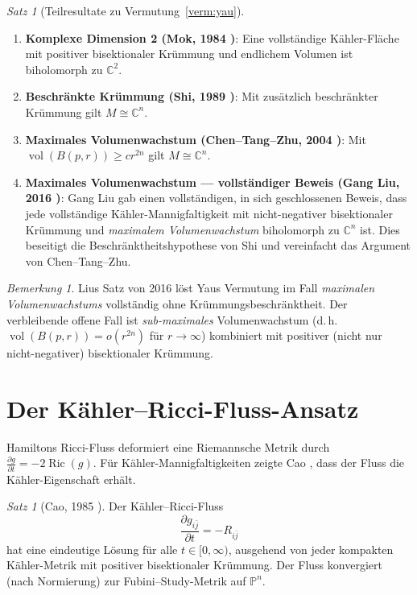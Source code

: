 \documentclass[12pt,a4paper]{amsart}
\theoremstyle{definition}
\theoremstyle{remark}
\newtheorem{satz}[theorem]{Satz}
\newtheorem{bemerkung}[theorem]{Bemerkung}
\DeclareMathOperator{\Ric}{Ric}
\DeclareMathOperator{\vol}{vol}
\newcommand{\CC}{\mathbb{C}}
\newcommand{\PP}{\mathbb{P}}
\begin{document}
\begin{satz}[Teilresultate zu Vermutung~\ref{verm:yau}]
\begin{enumerate}[label=(\roman*)]
  \item \textbf{Komplexe Dimension 2 (Mok, 1984 \cite{Mok1984})}:
        Eine vollständige Kähler-Fläche mit positiver bisektionaler Krümmung
        und endlichem Volumen ist biholomorph zu $\CC^2$.
  \item \textbf{Beschränkte Krümmung (Shi, 1989 \cite{Shi1989})}:
        Mit zusätzlich beschränkter Krümmung gilt $M \cong \CC^n$.
  \item \textbf{Maximales Volumenwachstum (Chen--Tang--Zhu, 2004
        \cite{ChenTangZhu2004})}: Mit $\vol(B(p,r)) \ge c r^{2n}$
        gilt $M \cong \CC^n$.
  \item \textbf{Maximales Volumenwachstum — vollständiger Beweis (Gang Liu, 2016
        \cite{GangLiu2016})}: Gang Liu gab einen vollständigen,
        in sich geschlossenen Beweis, dass jede vollständige Kähler-Mannigfaltigkeit
        mit nicht-negativer bisektionaler Krümmung und \emph{maximalem
        Volumenwachstum} biholomorph zu $\CC^n$ ist.  Dies beseitigt die
        Beschränktheitshypothese von Shi und vereinfacht das Argument
        von Chen--Tang--Zhu.
\end{enumerate}
\end{satz}

\begin{bemerkung}
Lius Satz von 2016 \cite{GangLiu2016} löst Yaus Vermutung im Fall
\emph{maximalen Volumenwachstums} vollständig ohne Krümmungsbeschränktheit.
Der verbleibende offene Fall ist \emph{sub-maximales} Volumenwachstum
(d.\,h.\ $\vol(B(p,r)) = o(r^{2n})$ für $r \to \infty$) kombiniert mit
positiver (nicht nur nicht-negativer) bisektionaler Krümmung.
\end{bemerkung}

\section{Der Kähler--Ricci-Fluss-Ansatz}

Hamiltons Ricci-Fluss \cite{Hamilton1982} deformiert eine Riemannsche Metrik
durch $\frac{\partial g}{\partial t} = -2\Ric(g)$.  Für Kähler-Mannigfaltigkeiten
zeigte Cao \cite{Cao1985}, dass der Fluss die Kähler-Eigenschaft erhält.

\begin{satz}[Cao, 1985 \cite{Cao1985}]
Der Kähler--Ricci-Fluss
\[
  \frac{\partial g_{i\bar{j}}}{\partial t} = -R_{i\bar{j}}
\]
hat eine eindeutige Lösung für alle $t \in [0,\infty)$, ausgehend von jeder
kompakten Kähler-Metrik mit positiver bisektionaler Krümmung.  Der Fluss
konvergiert (nach Normierung) zur Fubini--Study-Metrik auf $\PP^n$.
\end{satz}
\end{document}
